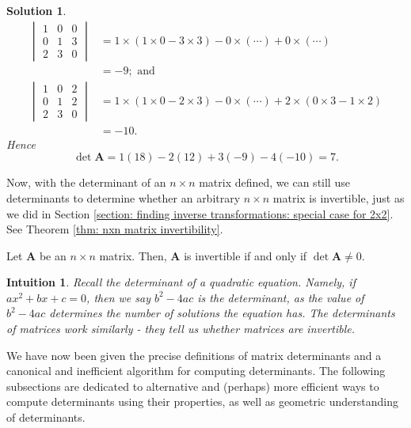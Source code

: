 \documentclass[]{book}
\newcommand{\mat}[1]{\ensuremath{\mathbf{#1}}}
\newtheorem*{solution}{Solution}
\newtheorem*{intuition}{Intuition}
\begin{document}
\begin{example}
\begin{solution}
\begin{align*}
        \begin{vmatrix}1 & 0 & 0 \\ 0 & 1 & 3 \\ 2 & 3 & 0\end{vmatrix} &= 1 \times (1 \times 0 - 3 \times 3) - 0 \times (\cdots) + 0 \times (\cdots) \\
        &= -9; \text{ and}\\
        \begin{vmatrix} 1 & 0 & 2 \\ 0 & 1 & 2 \\ 2 & 3 & 0\end{vmatrix} &= 1 \times (1 \times 0 - 2 \times 3) - 0 \times (\cdots) + 2 \times (0 \times 3 - 1 \times 2) \\
        &= -10.
    \end{align*}
    Hence \[\det\mat{A} = 1(18) - 2(12) + 3(-9) - 4(-10) = 7.\] \hfill \qedsymbol
        
\end{solution}
\end{example}

Now, with the determinant of an $n \times n$ matrix defined, we can still use determinants to determine whether an arbitrary $n \times n$ matrix is invertible, just as we did in Section \ref{section: finding inverse transformations: special case for 2x2}. See Theorem \ref{thm: nxn matrix invertibility}.

\begin{theorem}
    \label{thm: nxn matrix invertibility}
    Let $\mat{A}$ be an $n \times n$ matrix. Then, $\mat{A}$ is invertible if and only if $\det\mat{A} \neq 0$.

\end{theorem}

\begin{intuition}
    Recall the determinant of a quadratic equation. Namely, if $ax^2 + bx + c=0$, then we say $b^2-4ac$ is the determinant, as the value of $b^2-4ac$ \emph{determines} the number of solutions the equation has. The determinants of matrices work similarly - they tell us whether matrices are invertible.
\end{intuition}

We have now been given the precise definitions of matrix determinants and a canonical and inefficient algorithm for computing determinants. The following subsections are dedicated to alternative and (perhaps) more efficient ways to compute determinants using their properties, as well as geometric understanding of determinants.
\end{document}
